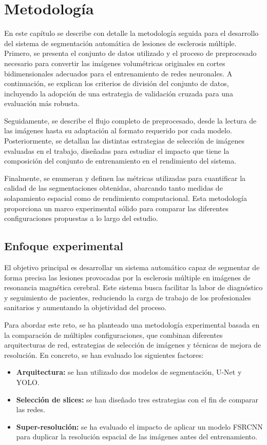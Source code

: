 \documentclass[../main.tex]{subfiles}
\begin{document}
\section{Metodología}
En este capítulo se describe con detalle la metodología seguida para el desarrollo del sistema de segmentación automática de lesiones de esclerosis múltiple. Primero, se presenta el conjunto de datos utilizado y el proceso de preprocesado necesario para convertir las imágenes volumétricas originales en cortes bidimensionales adecuados para el entrenamiento de redes neuronales. A continuación, se explican los criterios de división del conjunto de datos, incluyendo la adopción de una estrategia de validación cruzada para una evaluación más robusta.

Seguidamente, se describe el flujo completo de preprocesado, desde la lectura de las imágenes hasta su adaptación al formato requerido por cada modelo. Posteriormente, se detallan las distintas estrategias de selección de imágenes evaluadas en el trabajo, diseñadas para estudiar el impacto que tiene la composición del conjunto de entrenamiento en el rendimiento del sistema.

Finalmente, se enumeran y definen las métricas utilizadas para cuantificar la calidad de las segmentaciones obtenidas, abarcando tanto medidas de solapamiento espacial como de rendimiento computacional. Esta metodología proporciona un marco experimental sólido para comparar las diferentes configuraciones propuestas a lo largo del estudio.

\subsection{Enfoque experimental}
El objetivo principal es desarrollar un sistema automático capaz de segmentar de forma precisa las lesiones provocadas por la esclerosis múltiple en imágenes de resonancia magnética cerebral. Este sistema busca facilitar la labor de diagnóstico y seguimiento de pacientes, reduciendo la carga de trabajo de los profesionales sanitarios y aumentando la objetividad del proceso.

Para abordar este reto, se ha planteado una metodología experimental basada en la comparación de múltiples configuraciones, que combinan diferentes arquitecturas de red, estrategias de selección de imágenes y técnicas de mejora de resolución. En concreto, se han evaluado los siguientes factores:

\begin{itemize}
    \item \textbf{Arquitectura:} se han utilizado dos modelos de segmentación, U-Net y YOLO.
    \item \textbf{Selección de slices:} se han diseñado tres estrategias con el fin de comparar las redes.
    \item \textbf{Super-resolución:} se ha evaluado el impacto de aplicar un modelo FSRCNN para duplicar la resolución espacial de las imágenes antes del entrenamiento.
\end{itemize}
\end{document}
